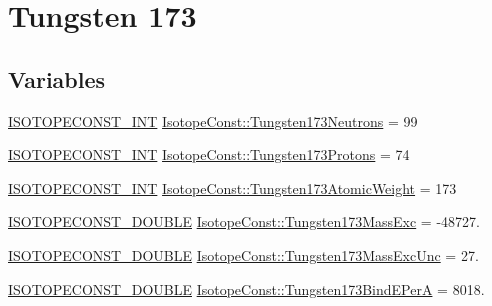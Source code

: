 \hypertarget{group___isotope_const-_tungsten-_w173}{}\section{Tungsten 173}
\label{group___isotope_const-_tungsten-_w173}
\subsection*{Variables}
\begin{DoxyCompactItemize}
\item 
\mbox{\hyperlink{group___isotope_const-_macros_ga5f18360b3e99483a35c32d789e62621c}{I\+S\+O\+T\+O\+P\+E\+C\+O\+N\+S\+T\+\_\+\+I\+NT}} \mbox{\hyperlink{group___isotope_const-_tungsten-_w173_gaeeda70f5a1b92c541adeca789fe7eac4}{Isotope\+Const\+::\+Tungsten173\+Neutrons}} = 99
\item 
\mbox{\hyperlink{group___isotope_const-_macros_ga5f18360b3e99483a35c32d789e62621c}{I\+S\+O\+T\+O\+P\+E\+C\+O\+N\+S\+T\+\_\+\+I\+NT}} \mbox{\hyperlink{group___isotope_const-_tungsten-_w173_ga7fffac6a3f5b8830c28558d6480857ab}{Isotope\+Const\+::\+Tungsten173\+Protons}} = 74
\item 
\mbox{\hyperlink{group___isotope_const-_macros_ga5f18360b3e99483a35c32d789e62621c}{I\+S\+O\+T\+O\+P\+E\+C\+O\+N\+S\+T\+\_\+\+I\+NT}} \mbox{\hyperlink{group___isotope_const-_tungsten-_w173_gab74971db9906d505489a6f70b06130c0}{Isotope\+Const\+::\+Tungsten173\+Atomic\+Weight}} = 173
\item 
\mbox{\hyperlink{group___isotope_const-_macros_ga8f45a7272ce02c0b4c65c44636ed719a}{I\+S\+O\+T\+O\+P\+E\+C\+O\+N\+S\+T\+\_\+\+D\+O\+U\+B\+LE}} \mbox{\hyperlink{group___isotope_const-_tungsten-_w173_ga12f8e2360a75fcf7dca6adae4318a2d7}{Isotope\+Const\+::\+Tungsten173\+Mass\+Exc}} = -\/48727.
\item 
\mbox{\hyperlink{group___isotope_const-_macros_ga8f45a7272ce02c0b4c65c44636ed719a}{I\+S\+O\+T\+O\+P\+E\+C\+O\+N\+S\+T\+\_\+\+D\+O\+U\+B\+LE}} \mbox{\hyperlink{group___isotope_const-_tungsten-_w173_ga5772dd6d5d2949b38928f40b8253cccc}{Isotope\+Const\+::\+Tungsten173\+Mass\+Exc\+Unc}} = 27.
\item 
\mbox{\hyperlink{group___isotope_const-_macros_ga8f45a7272ce02c0b4c65c44636ed719a}{I\+S\+O\+T\+O\+P\+E\+C\+O\+N\+S\+T\+\_\+\+D\+O\+U\+B\+LE}} \mbox{\hyperlink{group___isotope_const-_tungsten-_w173_ga5ee418e0a89ddaa6f2de4aaf05e0a4aa}{Isotope\+Const\+::\+Tungsten173\+Bind\+E\+PerA}} = 8018.
\item 

\end{DoxyCompactItemize}

